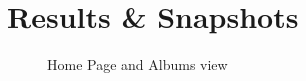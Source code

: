 \chapter{Results \& Snapshots}

\begin{figure}[H]
    \centering
    \qquad
    \caption{Home Page and Albums view}%
    \centering
\end{figure}

